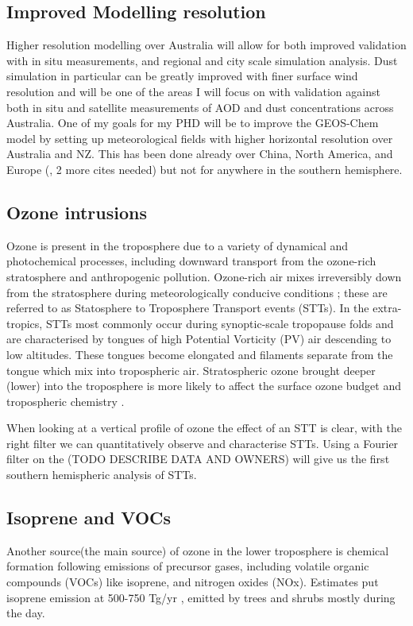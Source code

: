 \subsection{Improved Modelling resolution}
Higher resolution modelling over Australia will allow for both improved validation with in situ measurements, and regional and city scale simulation analysis. 
Dust simulation in particular can be greatly improved with finer surface wind resolution and will be one of the areas I will focus on with validation against both in situ and satellite measurements of AOD and dust concentrations across Australia.
One of my goals for my PHD will be to improve the GEOS-Chem model by setting up meteorological fields with higher horizontal resolution over Australia and NZ.
This has been done already over China, North America, and Europe (\cite{Chen_2009}, 2 more cites needed) but not for anywhere in the southern hemisphere.

\subsection{Ozone intrusions}
Ozone is present in the troposphere due to a variety of dynamical and photochemical processes, including downward  transport from the ozone-rich stratosphere and anthropogenic pollution.
Ozone-rich air mixes irreversibly down from the stratosphere during meteorologically conducive conditions \citep{Sprenger2003,Mihalikova2012}; these are referred to as Statosphere to Troposphere Transport events (STTs). 
In the extra-tropics, STTs most commonly occur during synoptic-scale tropopause folds \citep{Sprenger2003} and are characterised by tongues of high Potential Vorticity (PV) air descending to low altitudes.
These tongues become elongated and filaments separate from the tongue which mix into tropospheric air.
Stratospheric ozone brought deeper (lower) into the troposphere is more likely to affect the surface ozone budget and tropospheric chemistry \citep{Zanis2003,Langford_2009}.

When looking at a vertical profile of ozone the effect of an STT is clear, with the right filter we can quantitatively observe and characterise STTs.
Using a Fourier filter on the (TODO DESCRIBE DATA AND OWNERS) will give us the first southern hemispheric analysis of STTs.

\subsection{Isoprene and VOCs}
Another source(the main source) of ozone in the lower troposphere is chemical formation following emissions of precursor gases, including volatile organic compounds (VOCs) like isoprene, and nitrogen oxides (NOx).
Estimates put isoprene emission at 500-750 Tg/yr \cite{Guenther_2006}, emitted by trees and shrubs mostly during the day.

